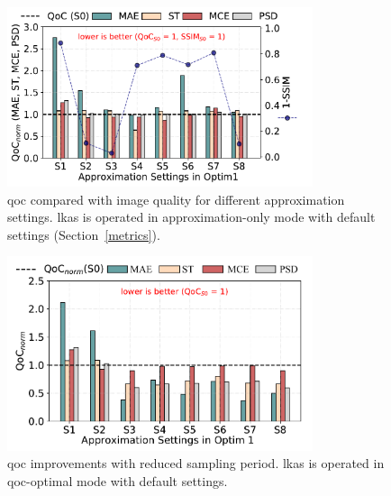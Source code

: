 \begin{figure}[ht]
    \centering
    \includegraphics[width=0.8\textwidth]{figs/qoc_wotime_CPU_ALL_GPU1.pdf}
		\captionsetup{width=\linewidth}
		\caption{{\Gls{qoc} compared with image quality for different approximation settings. \gls{lkas} is operated in approximation-only mode with default settings (Section~\ref{metrics}).}}
		\label{fig:qoc_wotime}
\end{figure}  


\begin{figure}[thb]
    \centering
		\includegraphics[width=0.8\textwidth]{figs/qoc_wtime_CPU_ALL_GPU1_2.pdf}
		\captionsetup{width=\linewidth}
		\caption{{\Gls{qoc} improvements with reduced sampling period. \gls{lkas} is operated in \gls{qoc}-optimal mode with default settings.}}
		\label{fig:qoc_wtime}
\end{figure}  

